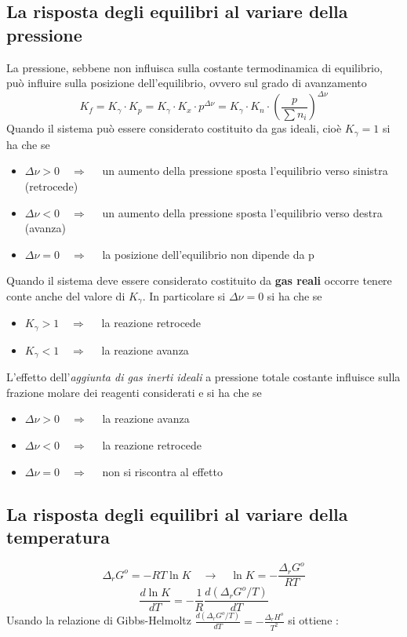 \documentclass{article}
\newcommand{\so}{\quad \rightarrow \quad}
\newcommand{\So}{\quad \Rightarrow \quad}
\begin{document}
\subsection{La risposta degli equilibri al variare della pressione}
La pressione, sebbene non influisca sulla costante termodinamica di equilibrio, può influire sulla posizione dell'equilibrio, ovvero sul grado di avanzamento
\begin{equation*}
    K_f=K_\gamma\cdot K_p=K_\gamma \cdot K_x \cdot p^{\Delta \nu}=K_\gamma \cdot K_n\cdot \left(\frac{p}{\sum n_i}\right)^{\Delta \nu}
\end{equation*}
Quando il sistema può essere considerato costituito da gas ideali, cioè $K_\gamma =1$ si ha che se
\begin{itemize}
    \item $\Delta \nu > 0 \So$ un aumento della pressione sposta l'equilibrio verso sinistra (retrocede)
    \item $\Delta \nu < 0 \So$ un aumento della pressione sposta l'equilibrio verso destra (avanza)
    \item $\Delta \nu = 0 \So$ la posizione dell'equilibrio non dipende da p
\end{itemize}
Quando il sistema deve essere considerato costituito da \textbf{gas reali} occorre tenere conte anche del valore di $K_\gamma$. In particolare si $\Delta \nu=0$ si ha che se
\begin{itemize}
    \item $K_\gamma >1 \So$ la reazione retrocede
    \item $K_\gamma <1 \So$ la reazione avanza
\end{itemize}
L'effetto dell'\textit{aggiunta di gas inerti ideali} a pressione totale costante influisce sulla frazione molare dei reagenti considerati e si ha che se
\begin{itemize}
    \item $\Delta \nu > 0 \So$ la reazione avanza
    \item $\Delta \nu < 0 \So$ la reazione retrocede
    \item $\Delta \nu = 0 \So$ non si riscontra al effetto
\end{itemize}

\subsection{La risposta degli equilibri al variare della temperatura}
\begin{equation*}
    \Delta_rG^o=-RT\ln K \so \ln K=-\frac{\Delta_rG^o}{RT}
\end{equation*}
\begin{equation*}
    \frac{d\ln K}{dT}=-\frac{1}{R}\frac{d(\Delta_rG^o/T)}{dT}
\end{equation*}
Usando la relazione di Gibbs-Helmoltz $\frac{d(\Delta_rG^o/T)}{dT}=-\frac{\Delta_rH^o}{T^2}$ si ottiene :
\end{document}
